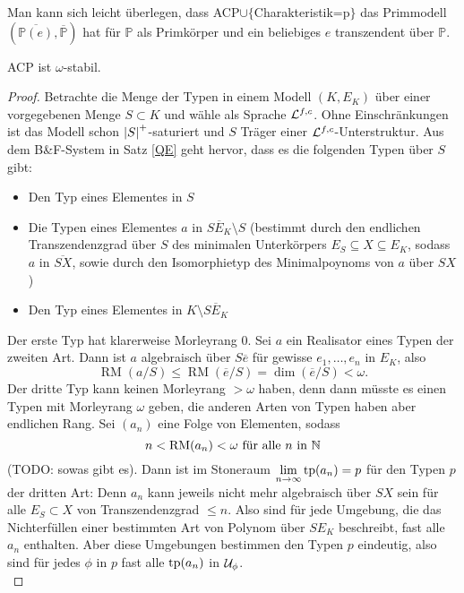     \begin{corollary}
    	Man kann sich leicht überlegen, dass ACP$\cup\{$\glqq{}Charakteristik=p\grqq{}$\}$ das Primmodell $(\overline{\mathbb{P}(e)},\overline{\mathbb{P}})$ hat für $\mathbb{P}$ als Primkörper und ein beliebiges $e$ transzendent über $\mathbb{P}$.
    \end{corollary}
    \newpage
    \begin{theorem}
    	ACP ist $\omega$-stabil.
    \end{theorem}
    \begin{proof}
    	Betrachte die Menge der Typen in einem Modell $(K,E_K)$ über einer vorgegebenen Menge $S\subset K$ und wähle als Sprache $\mathcal{L}^{f,c}$. Ohne Einschränkungen ist das Modell schon ${\left| S \right|}^+$-saturiert und $S$ Träger einer $\mathcal{L}^{f,c}$-Unterstruktur. Aus dem B\&F-System in Satz \ref{QE} geht hervor, dass es die folgenden Typen über $S$ gibt:
    	\begin{itemize}
    		\item Den Typ eines Elementes in $S$
    		\item Die Typen eines Elementes $a$ in $\overline{SE_K}\setminus S$ (bestimmt durch den endlichen Trans\-zen\-denz\-grad über $S$ des minimalen Unterkörpers $E_S\subseteq X\subseteq E_K$, sodass $a$ in $\overline{SX}$, sowie durch den Isomorphietyp des Minimalpoynoms von $a$ über $SX$)
    		\item Den Typ eines Elementes in $K\setminus\overline{SE_K}$
    	\end{itemize}
        Der erste Typ hat klarerweise Morleyrang 0. Sei $a$ ein Realisator eines Typen der zweiten Art. Dann ist $a$ algebraisch über $S\overline{e}$ für gewisse $e_1,\dots,e_n$ in $E_K$, also $$\operatorname{RM}(a/S)\leq\operatorname{RM}(\overline{e}/S)=\dim(\overline{e}/S)<\omega.$$
        Der dritte Typ kann keinen Morleyrang $>\omega$ haben, denn dann müsste es einen Typen mit Morleyrang $\omega$ geben, die anderen Arten von Typen haben aber endlichen Rang. Sei $(a_n)$ eine Folge von Elementen, sodass $$n<\operatorname{RM}(a_n)<\omega\text{ für alle }n\text{ in }\mathbb{N}$$ (TODO: sowas gibt es). Dann ist im Stoneraum $\lim\limits_{n\rightarrow\infty}\operatorname{tp}(a_n)=p$ für den Typen $p$ der dritten Art: Denn $a_n$ kann jeweils nicht mehr algebraisch über $SX$ sein für alle $E_S\subset X$ von Transzendenzgrad $\leq n$. Also sind für jede Umgebung, die das Nichterfüllen einer bestimmten Art von Polynom über $SE_K$ beschreibt, fast alle $a_n$ enthalten. Aber diese Umgebungen bestimmen den Typen $p$ eindeutig, also sind für jedes $\phi$ in $p$ fast alle $\operatorname{tp}(a_n)$ in $\mathcal{U}_\phi$.\\

\end{proof}
